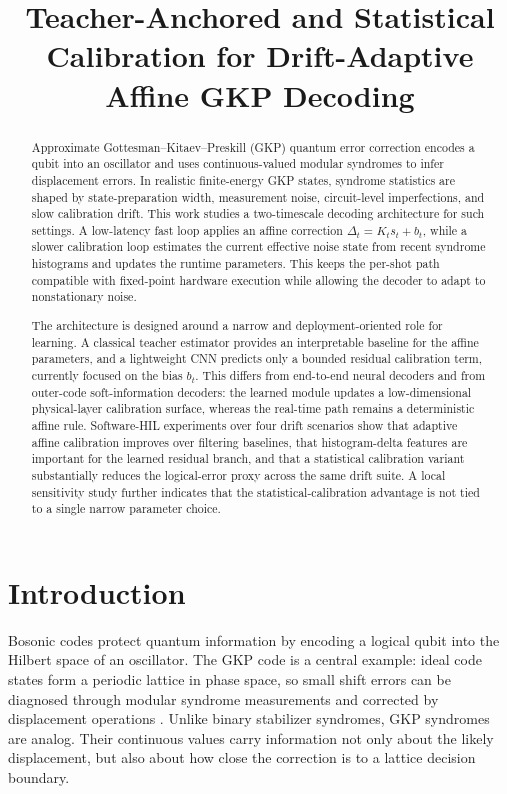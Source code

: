 \documentclass[11pt]{article}
\title{Teacher-Anchored and Statistical Calibration for Drift-Adaptive Affine GKP Decoding}
\author{}
\date{}
\begin{document}
\maketitle

\begin{abstract}
Approximate Gottesman--Kitaev--Preskill (GKP) quantum error correction
encodes a qubit into an oscillator and uses continuous-valued modular
syndromes to infer displacement errors.  In realistic finite-energy GKP
states, syndrome statistics are shaped by state-preparation width,
measurement noise, circuit-level imperfections, and slow calibration drift.
This work studies a two-timescale decoding architecture for such settings.  A
low-latency fast loop applies an affine correction
\(\Delta_t=K_t s_t+b_t\), while a slower calibration loop estimates the current
effective noise state from recent syndrome histograms and updates the runtime
parameters.  This keeps the per-shot path compatible with fixed-point hardware
execution while allowing the decoder to adapt to nonstationary noise.

The architecture is designed around a narrow and deployment-oriented role for
learning.  A classical teacher estimator provides an interpretable baseline
for the affine parameters, and a lightweight CNN predicts only a bounded
residual calibration term, currently focused on the bias \(b_t\).  This differs
from end-to-end neural decoders and from outer-code soft-information decoders:
the learned module updates a low-dimensional physical-layer calibration
surface, whereas the real-time path remains a deterministic affine rule.
Software-HIL experiments over four drift scenarios show that adaptive affine
calibration improves over filtering baselines, that histogram-delta features
are important for the learned residual branch, and that a statistical
calibration variant substantially reduces the logical-error proxy across the
same drift suite.  A local sensitivity study further indicates that the
statistical-calibration advantage is not tied to a single narrow parameter
choice.
\end{abstract}

\tableofcontents

\section{Introduction}

Bosonic codes protect quantum information by encoding a logical qubit into the
Hilbert space of an oscillator.  The GKP code is a central example: ideal code
states form a periodic lattice in phase space, so small shift errors can be
diagnosed through modular syndrome measurements and corrected by displacement
operations \cite{gkp2001,grimsmo2021}.  Unlike binary stabilizer syndromes, GKP
syndromes are analog.  Their continuous values carry information not only
about the likely displacement, but also about how close the correction is to a
lattice decision boundary.
\end{document}
